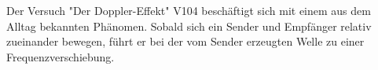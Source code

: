  Der Versuch "Der Doppler-Effekt" V104 beschäftigt sich mit einem aus dem Alltag bekannten Phänomen. Sobald sich ein Sender und Empfänger
 relativ zueinander bewegen, führt er bei der vom Sender erzeugten Welle zu einer Frequenzverschiebung.
